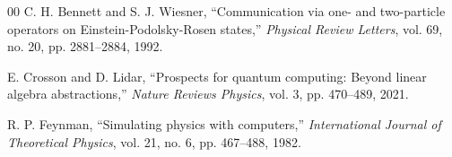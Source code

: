 \documentclass[conference]{IEEEtran}
\begin{document}
\begin{thebibliography}{00}
 C. H. Bennett and S. J. Wiesner, ``Communication via one- and two-particle operators on Einstein-Podolsky-Rosen states,'' \emph{Physical Review Letters}, vol. 69, no. 20, pp. 2881--2884, 1992.

 E. Crosson and D. Lidar, ``Prospects for quantum computing: Beyond linear algebra abstractions,'' \emph{Nature Reviews Physics}, vol. 3, pp. 470--489, 2021.

 R. P. Feynman, ``Simulating physics with computers,'' \emph{International Journal of Theoretical Physics}, vol. 21, no. 6, pp. 467--488, 1982.

\end{thebibliography}
\end{document}
